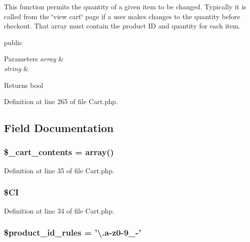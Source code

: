 This function permits the quantity of a given item to be changed. Typically it is called from the \char`\"{}view cart\char`\"{} page if a user makes changes to the quantity before checkout. That array must contain the product I\-D and quantity for each item.

public 
\begin{DoxyParams}{Parameters}
{\em array} & \\
\hline
{\em string} & \\
\hline
\end{DoxyParams}
\begin{DoxyReturn}{Returns}
bool 
\end{DoxyReturn}


Definition at line 265 of file Cart.\-php.



\subsection{Field Documentation}
\subsubsection[{\$\-\_\-cart\-\_\-contents}]{\setlength{\rightskip}{0pt plus 5cm}\$\-\_\-cart\-\_\-contents = array()}\label{class_c_i___cart_a93aff4174af6004d8cc7a51bf0c59632}


Definition at line 35 of file Cart.\-php.

\subsubsection[{\$\-C\-I}]{\setlength{\rightskip}{0pt plus 5cm}\$C\-I}\label{class_c_i___cart_ae0314d046ddf7fcfaec03222977427d3}


Definition at line 34 of file Cart.\-php.

\subsubsection[{\$product\-\_\-id\-\_\-rules}]{\setlength{\rightskip}{0pt plus 5cm}\$product\-\_\-id\-\_\-rules = '\textbackslash{}.{\bf a}-\/z0-\/9\-\_\--\/'}\label{class_c_i___cart_aef9fb0bb2a9ab37008d77ed80b7b122b}



